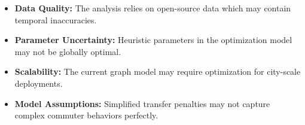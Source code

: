 
\begin{itemize}
    \item \textbf{Data Quality:} The analysis relies on open-source data which may contain temporal inaccuracies.
    \item \textbf{Parameter Uncertainty:} Heuristic parameters in the optimization model may not be globally optimal.
    \item \textbf{Scalability:} The current graph model may require optimization for city-scale deployments.
    \item \textbf{Model Assumptions:} Simplified transfer penalties may not capture complex commuter behaviors perfectly.
\end{itemize}
